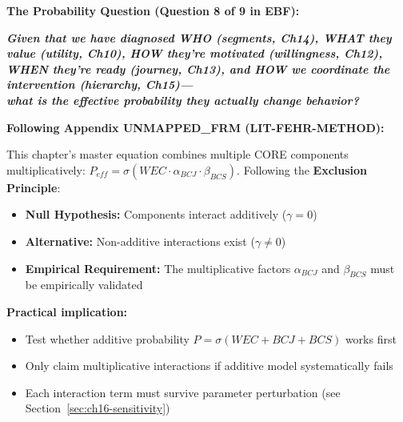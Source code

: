\begin{tcolorbox}[colback=red!10!white, colframe=red!75!black, title=Central Question of Chapter 16]
\textbf{The Probability Question (Question 8 of 9 in EBF):}

\Large\textbf{\textit{Given that we have diagnosed WHO (segments, Ch14), WHAT they value (utility, Ch10), HOW they're motivated (willingness, Ch12), WHEN they're ready (journey, Ch13), and HOW we coordinate the intervention (hierarchy, Ch15)---\\[8pt]what is the effective probability they actually change behavior?}}

\end{tcolorbox}

\begin{tcolorbox}[colback=red!5!white, colframe=red!75!black,
    title=\textbf{Methodological Note: The Exclusion Principle (Appendix UNMAPPED_FRM)}]
\textbf{Following Appendix UNMAPPED_FRM (LIT-FEHR-METHOD):}

This chapter's master equation combines multiple CORE components multiplicatively: $P_{eff} = \sigma(WEC \cdot \alpha_{BCJ} \cdot \beta_{BCS})$. Following the \textbf{Exclusion Principle}:
\begin{itemize}[nosep]
    \item \textbf{Null Hypothesis:} Components interact additively ($\gamma = 0$)
    \item \textbf{Alternative:} Non-additive interactions exist ($\gamma \neq 0$)
    \item \textbf{Empirical Requirement:} The multiplicative factors $\alpha_{BCJ}$ and $\beta_{BCS}$ must be empirically validated
\end{itemize}

\textbf{Practical implication:}
\begin{itemize}[nosep]
    \item Test whether additive probability $P = \sigma(WEC + BCJ + BCS)$ works first
    \item Only claim multiplicative interactions if additive model systematically fails
    \item Each interaction term must survive parameter perturbation (see Section~\ref{sec:ch16-sensitivity})
\end{itemize}
\end{tcolorbox}

